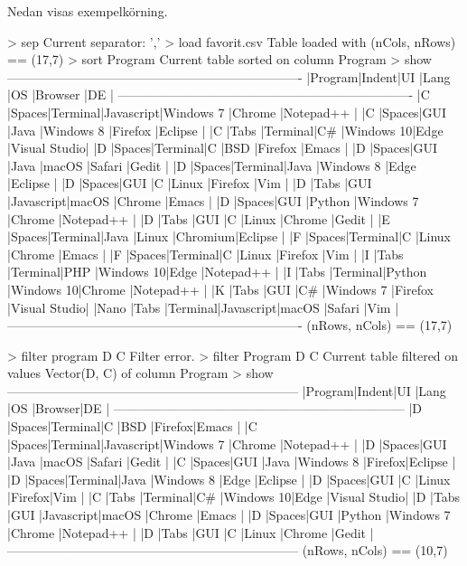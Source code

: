 Nedan visas exempelkörning.
\begin{REPLnonum}
> sep
Current separator: ','
> load favorit.csv
Table loaded with (nCols, nRows) == (17,7)
> sort Program
Current table sorted on column Program
> show
----------------------------------------------------------------------
|Program|Indent|UI      |Lang      |OS        |Browser |DE           |
----------------------------------------------------------------------
|C      |Spaces|Terminal|Javascript|Windows 7 |Chrome  |Notepad++    |
|C      |Spaces|GUI     |Java      |Windows 8 |Firefox |Eclipse      |
|C      |Tabs  |Terminal|C#        |Windows 10|Edge    |Visual Studio|
|D      |Spaces|Terminal|C         |BSD       |Firefox |Emacs        |
|D      |Spaces|GUI     |Java      |macOS     |Safari  |Gedit        |
|D      |Spaces|Terminal|Java      |Windows 8 |Edge    |Eclipse      |
|D      |Spaces|GUI     |C         |Linux     |Firefox |Vim          |
|D      |Tabs  |GUI     |Javascript|macOS     |Chrome  |Emacs        |
|D      |Spaces|GUI     |Python    |Windows 7 |Chrome  |Notepad++    |
|D      |Tabs  |GUI     |C         |Linux     |Chrome  |Gedit        |
|E      |Spaces|Terminal|Java      |Linux     |Chromium|Eclipse      |
|F      |Spaces|Terminal|C         |Linux     |Chrome  |Emacs        |
|F      |Spaces|Terminal|C         |Linux     |Firefox |Vim          |
|I      |Tabs  |Terminal|PHP       |Windows 10|Edge    |Notepad++    |
|I      |Tabs  |Terminal|Python    |Windows 10|Chrome  |Notepad++    |
|K      |Tabs  |GUI     |C#        |Windows 7 |Firefox |Visual Studio|
|Nano   |Tabs  |Terminal|Javascript|macOS     |Safari  |Vim          |
----------------------------------------------------------------------
 (nRows, nCols) == (17,7)

> filter program D C
Filter error.
> filter Program D C
Current table filtered on values Vector(D, C) of column Program
> show
---------------------------------------------------------------------
|Program|Indent|UI      |Lang      |OS        |Browser|DE           |
---------------------------------------------------------------------
|D      |Spaces|Terminal|C         |BSD       |Firefox|Emacs        |
|C      |Spaces|Terminal|Javascript|Windows 7 |Chrome |Notepad++    |
|D      |Spaces|GUI     |Java      |macOS     |Safari |Gedit        |
|C      |Spaces|GUI     |Java      |Windows 8 |Firefox|Eclipse      |
|D      |Spaces|Terminal|Java      |Windows 8 |Edge   |Eclipse      |
|D      |Spaces|GUI     |C         |Linux     |Firefox|Vim          |
|C      |Tabs  |Terminal|C#        |Windows 10|Edge   |Visual Studio|
|D      |Tabs  |GUI     |Javascript|macOS     |Chrome |Emacs        |
|D      |Spaces|GUI     |Python    |Windows 7 |Chrome |Notepad++    |
|D      |Tabs  |GUI     |C         |Linux     |Chrome |Gedit        |
---------------------------------------------------------------------
(nRows, nCols) == (10,7)


\end{REPLnonum}
